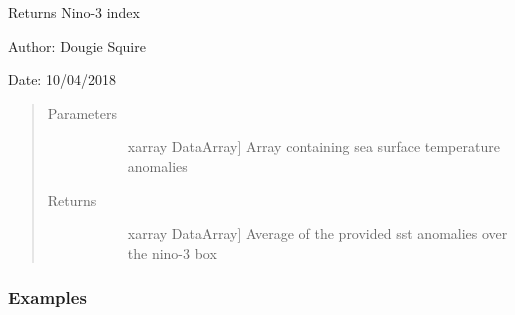\documentclass[letterpaper,10pt,english]{sphinxmanual}
\begin{document}
\begin{fulllineitems}
\label{\detokenize{diagnostic_doc:diagnostic.nino3}}
Returns Nino-3 index

\begin{DUlineblock}{0em}
\item[] Author: Dougie Squire
\item[] Date: 10/04/2018
\end{DUlineblock}
\begin{quote}\begin{description}
\item[{Parameters}] \leavevmode\begin{description}
\item[{}] \leavevmode{[}xarray DataArray{]}
Array containing sea surface temperature anomalies

\end{description}

\item[{Returns}] \leavevmode\begin{description}
\item[{}] \leavevmode{[}xarray DataArray{]}
Average of the provided sst anomalies over the nino-3 box

\end{description}

\end{description}\end{quote}
\subsubsection*{Examples}


\end{fulllineitems}
\end{document}
